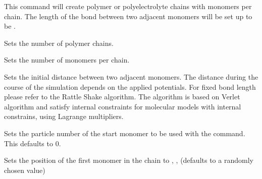 This command will create  polymer or
polyelectrolyte chains with  monomers per
chain. The length of the bond between two adjacent monomers will be
set up to be .

\begin{arguments}
\item[\var{num\_polymers}] Sets the number of polymer chains.
\item[\var{monomers\_per\_chain}] Sets the number of monomers per
  chain.
\item[\var{bond\_length}] Sets the initial distance between two
  adjacent monomers. The distance during the course of the simulation
  depends on the applied potentials. For fixed bond length please
  refer to the Rattle Shake algorithm\cite{andersen83a}.  The algorithm
  is based on Verlet algorithm and satisfy internal constraints for
  molecular models with internal constrains, using Lagrange
  multipliers.
\item[\opt{start \var{pid}}] Sets the particle number of the
  start monomer to be used with the  command. This
  defaults to 0.

\item[\opt{pos \var{x} \var{y} \var{z}}] Sets the position of the
  first monomer in the chain to , ,  (defaults to
  a randomly chosen value)
  

\end{arguments}
